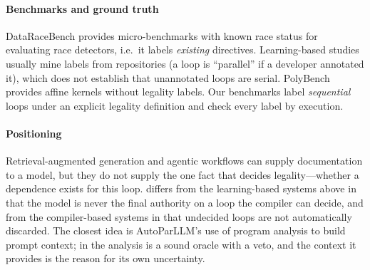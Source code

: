 \paragraph{Benchmarks and ground truth} DataRaceBench \cite{liao2017dataracebench} provides micro-benchmarks with known race status for evaluating race detectors, i.e.\ it labels \emph{existing} directives. Learning-based studies usually mine labels from repositories (a loop is ``parallel'' if a developer annotated it), which does not establish that unannotated loops are serial. PolyBench \cite{pouchet2012} provides affine kernels without legality labels. Our benchmarks label \emph{sequential} loops under an explicit legality definition and check every label by execution.

\paragraph{Positioning} Retrieval-augmented generation and agentic workflows can supply documentation to a model, but they do not supply the one fact that decides legality---whether a dependence exists for this loop. \SystemName{} differs from the learning-based systems above in that the model is never the final authority on a loop the compiler can decide, and from the compiler-based systems in that undecided loops are not automatically discarded. The closest idea is AutoParLLM's use of program analysis to build prompt context; in \SystemName{} the analysis is a sound oracle with a veto, and the context it provides is the reason for its own uncertainty.
